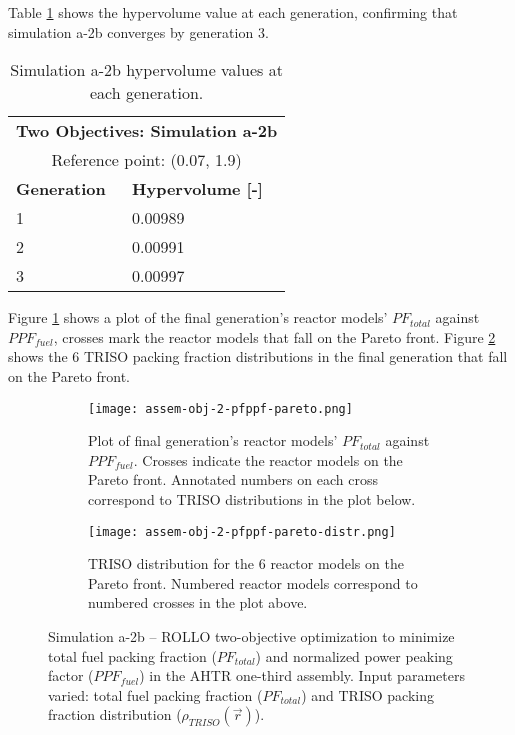 Table \ref{tab:a2b-hypervolume} shows the hypervolume value at each generation, 
confirming that simulation a-2b converges by generation 3. 
\begin{table}[htbp!]
    \centering
    \onehalfspacing
    \caption{Simulation a-2b hypervolume values at each generation.}
	\label{tab:a2b-hypervolume}
    \footnotesize
    \begin{tabular}{ll}
    \hline 
    \multicolumn{2}{c}{\textbf{Two Objectives: Simulation a-2b}} \\
    \multicolumn{2}{c}{Reference point: (0.07, 1.9)} \\
    \hline 
    \textbf{Generation} & \textbf{Hypervolume [-]} \\
    \hline
    1 & 0.00989 \\
    2 & 0.00991 \\
    3 & 0.00997 \\
    \hline
    \end{tabular}
\end{table}

Figure \ref{fig:assem-obj-2-pfppf-pareto} shows a plot of the final generation's reactor 
models' $PF_{total}$ against $PPF_{fuel}$, crosses mark the reactor models that fall on 
the Pareto front.
Figure \ref{fig:assem-obj-2-pfppf-pareto-distr} shows the 6 TRISO packing fraction 
distributions in the final generation that fall on the Pareto front. 
\begin{figure}[htbp!]
    \begin{subfigure}{\textwidth}
        \centering
        \texttt{[image: assem-obj-2-pfppf-pareto.png]}
        \caption{Plot of final generation's reactor models' $PF_{total}$ against 
        $PPF_{fuel}$. 
        Crosses indicate the reactor models on the Pareto front. Annotated numbers 
        on each cross correspond to TRISO distributions in the plot below.}
        \label{fig:assem-obj-2-pfppf-pareto} 
    \end{subfigure}
    \begin{subfigure}{\textwidth}
        \centering
        \texttt{[image: assem-obj-2-pfppf-pareto-distr.png]}
        \caption{TRISO distribution for the 6 reactor models on the Pareto front.
        Numbered reactor models correspond to numbered crosses in the plot above. }
        \label{fig:assem-obj-2-pfppf-pareto-distr} 
    \end{subfigure}
    \caption{Simulation a-2b -- ROLLO two-objective optimization to minimize total fuel 
    packing fraction ($PF_{total}$) and normalized power peaking factor ($PPF_{fuel}$) 
    in the \gls{AHTR} one-third assembly. 
    Input parameters varied: total fuel packing fraction ($PF_{total}$) and TRISO 
    packing fraction distribution ($\rho_{TRISO}(\vec{r})$).}
    \label{fig:assem-obj-2-pfppf}
\end{figure}

